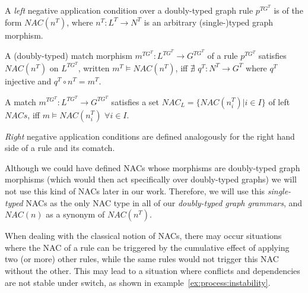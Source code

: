 \begin{definition} A \emph{left} negative application condition over a doubly-typed graph rule $p^{TG^T}$ is of the form $NAC(n^T)$, where $n^T : L^T \rightarrow N^T$ is an arbitrary (single-)typed graph morphism. 
 
A (doubly-typed) match morphism $m^{TG^T} : L^{TG^T} \rightarrow G^{TG^T}$ of a rule $p^{TG^T}$ satisfies $NAC(n^T)$ on $L^{TG^T}$, written \mbox{$m^T \models NAC(n^T)$}, iff $\nexists$ $q^T : N^T \rightarrow G^T$ where $q^T$ injective and $q^T \circ n^T = m^T$.


  A match $m^{TG^T} : L^{TG^T} \rightarrow G^{TG^T}$ satisfies a set \mbox{$NAC_L = \{NAC\left(n^T_i\right)|i \in I\}$} of left $NACs$, iff \mbox{$m \models NAC\left(n^T_i\right)$} $\forall i \in I$.

\emph{Right} negative application conditions are defined analogously for the right hand side of a rule and its comatch.


\end{definition}

\begin{example}
\end{example}

\begin{remark}
Although we could have defined NACs whose morphisms are doubly-typed graph morphisms (which would then act specifically over doubly-typed graphs) we will not use this kind of NACs later in our work. Therefore, we will use this \emph{single-typed} NACs as the only NAC type in all of our \emph{doubly-typed graph grammars}, and $NAC(n)$ as a synonym of $NAC(n^T)$.
\end{remark}

When dealing with the classical notion of NACs, there may occur situations where the NAC of a rule can be triggered by the cumulative effect of applying two (or more) other rules, while the same rules would not trigger this NAC without the other. This may lead to a situation where conflicts and dependencies are not stable under switch, as shown in example~\ref{ex:process:instability}.

